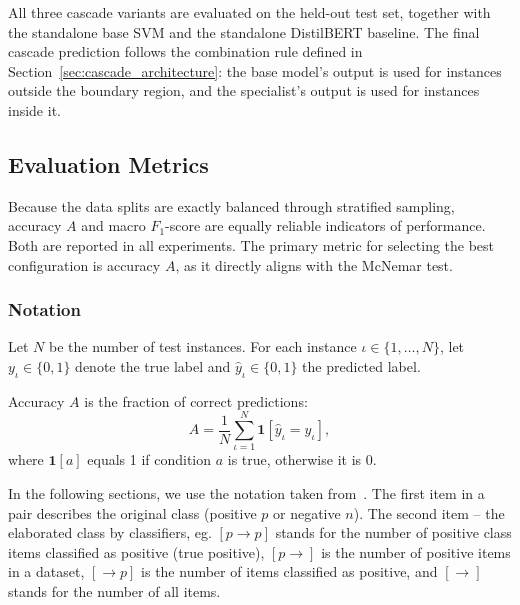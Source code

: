 \documentclass[a4paper,fleqn]{cas-dc}
\newcommand{\accuracy}{A}
\newcommand{\FOne}{F_1}
\newcommand{\positiveclass}{p}
\newcommand{\negativeclass}{n}
\newcommand{\ksTP}{[\positiveclass \to \positiveclass]}
\newcommand{\ksOriginalPositive}{[\positiveclass\to]}
\newcommand{\ksPredictedPositive}{[\to\positiveclass]}
\newcommand{\ksAll}{[\to]}
\newcommand{\predVal}{y}
\newcommand{\idx}{\iota}
\newcommand{\numVal}{N}
\begin{document}
All three cascade variants are evaluated on the held-out test set, together with the standalone base SVM and the standalone DistilBERT baseline. The final cascade prediction follows the combination rule defined in Section~\ref{sec:cascade_architecture}: the base model's output is used for instances outside the boundary region, and the specialist's output is used for instances inside it.

\subsection{Evaluation Metrics}

Because the data splits are exactly balanced through stratified sampling, accuracy $\accuracy$ and macro $\FOne$-score are equally reliable indicators of performance. 
Both are reported in all experiments. The primary metric for selecting the best configuration is accuracy $\accuracy$, as it directly aligns with the McNemar test.

\subsubsection{Notation}
Let $\numVal$ be the number of test instances. For each instance $\idx \in \{1,\dots,\numVal\}$, let $\predVal_{\idx} \in \{0,1\}$ denote the true label and $\hat{\predVal}_{\idx} \in \{0,1\}$ the predicted label.

Accuracy $\accuracy$ is the fraction of correct predictions:
\begin{equation}
	\accuracy = \frac{1}{\numVal} \sum_{\idx=1}^{\numVal} \mathbf{1}[\hat{\predVal}_{\idx} = \predVal_{\idx}],
\label{eq:accuracy}
\end{equation}
where $\mathbf{1}[a]$ equals 1 if condition $a$ is true, otherwise it is 0.

In the following sections, we use the notation taken from~\citep{id:Siminski2021Outlier}.
The first item in a pair describes the original class (positive $\positiveclass$ or negative $\negativeclass$). 
The second item -- the elaborated class by classifiers, eg.
$\ksTP$ stands for the number of positive class items classified as positive (true positive), 
$\ksOriginalPositive$ is the number of positive items in a dataset,
$\ksPredictedPositive$ is the number of items classified as positive,
and $\ksAll$ stands for the number of all items.
\end{document}
